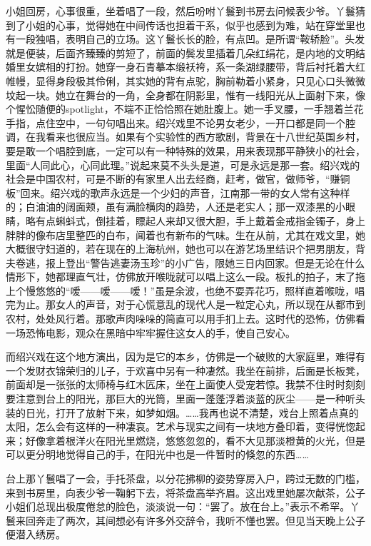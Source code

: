 \par 小姐回房，心事很重，坐着唱了一段，然后吩咐丫鬟到书房去问候表少爷。丫鬟猜到了小姐的心事，觉得她在中间传话也担着干系，似乎也感到为难，站在穿堂里也有一段独唱，表明自己的立场。这丫鬟长长的脸，有点凹。是所谓“鞍轿脸”。头发就是便装，后面齐臻臻的剪短了，前面的鬓发里插着几朵红绢花，是内地的文明结婚里女嫔相的打扮。她穿一身石青摹本缎袄袴，系一条湖绿腰带，背后衬托着大红帷幔，显得身段极其伶俐，其实她的背有点驼，胸前勒着小紧身，只见心口头微微坟起一块。她立在舞台的一角，全身都在阴影里，惟有一线阳光从上面射下来，像个惺忪随便的spotlight，不端不正恰恰照在她肚腹上。她一手叉腰，一手翘着兰花手指，点住空中，一句句唱出来。绍兴戏里不论男女老少，一开口都是同一个腔调，在我看来也很应当。如果有个实验性的西方歌剧，背景在十八世纪英国乡村，要是敢一个唱腔到底，一定可以有一种特殊的效果，用来表现那平静狭小的社会，里面“人同此心，心同此理。”说起来莫不头头是道，可是永远是那一套。绍兴戏的社会是中国农村，可是不断的有家里人出去经商，赶考，做官，做师爷，“赚铜板”回来。绍兴戏的歌声永远是一个少妇的声音，江南那一带的女人常有这种样的；白油油的阔面颊，虽有满脸横肉的趋势，人还是老实人；那一双漆黑的小眼睛，略有点蝌蚪式，倒挂着，瞟起人来却又很大胆，手上戴着金戒指金镯子，身上胖胖的像布店里整匹的白布，闻着也有新布的气味。生在从前，尤其在戏文里，她大概很守妇道的，若在现在的上海杭州，她也可以在游艺场里结识个把男朋友，背夫卷逃，报上登出“警告逃妻汤玉珍”的小广告，限她三日内回家。但是无论在什么情形下，她都理直气壮，仿佛放开喉咙就可以唱上这么一段。板扎的拍子，末了拖上个慢悠悠的“嗳——嗳——嗳！”虽是余波，也绝不耍弄花巧，照样直着喉咙，唱完为止。那女人的声音，对于心慌意乱的现代人是一粒定心丸，所以现在从都市到农村，处处风行着。那歌声肉哚哚的简直可以用手扪上去。这时代的恐怖，仿佛看一场恐怖电影，观众在黑暗中牢牢握住这女人的手，使自己安心。
\par 而绍兴戏在这个地方演出，因为是它的本乡，仿佛是一个破败的大家庭里，难得有一个发财衣锦荣归的儿子，于欢喜中另有一种凄然。我坐在前排，后面是长板凳，前面却是一张张的太师椅与红木匟床，坐在上面使人受宠若惊。我禁不住时时刻刻要注意到台上的阳光，那巨大的光筒，里面一蓬蓬浮着淡蓝的灰尘——是一种听头装的日光，打开了放射下来，如梦如烟。……我再也说不清楚，戏台上照着点真的太阳，怎么会有这样的一种凄哀。艺术与现实之间有一块地方叠印着，变得恍惚起来；好像拿着根洋火在阳光里燃烧，悠悠忽忽的，看不大见那淡橙黄的火光，但是可以更分明地觉得自己的手，在阳光中也是一件暂时的倏忽的东西……
\par 台上那丫鬟唱了一会，手托茶盘，以分花拂柳的姿势穿房入户，跨过无数的门槛，来到书房里，向表少爷一鞠躬下去，将茶盘高举齐眉。这出戏里她屡次献茶，公子小姐们总现出极度倦怠的脸色，淡淡说一句：“罢了。放在台上。”表示不希罕。丫鬟来回奔走了两次，其间想必有许多外交辞令，我听不懂也罢。但见当天晚上公子便潜入绣房。
